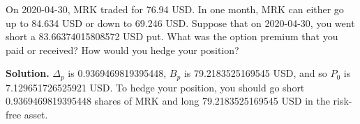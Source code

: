 \noindent On 2020-04-30, MRK traded for 76.94 USD. In one month, MRK can either go up to 84.634 USD or down to 69.246 USD. Suppose that on 2020-04-30, you went short a 83.66374015808572 USD put. What was the option premium that you paid or received? How would you hedge your position?

\vspace{9pt}

\noindent\textbf{Solution.} $\Delta_{p}$ is 0.9369469819395448, $B_{p}$ is 79.2183525169545 USD, and so $P_{0}$ is 7.129651726525921 USD. To hedge your position, you should go short 0.9369469819395448 shares of MRK and long 79.2183525169545 USD in the risk-free asset.